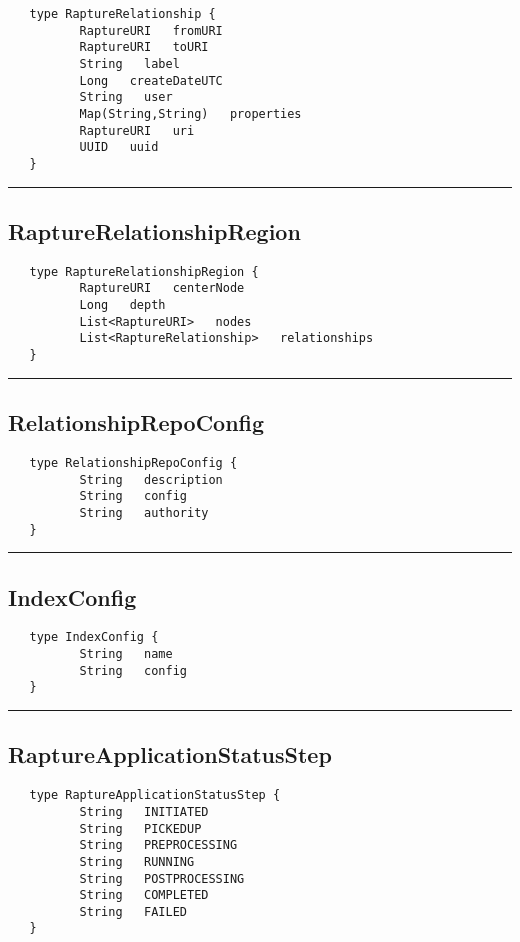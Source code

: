 \begin{verbatim}
   type RaptureRelationship {
          RaptureURI   fromURI
          RaptureURI   toURI
          String   label
          Long   createDateUTC
          String   user
          Map(String,String)   properties
          RaptureURI   uri
          UUID   uuid
   }
\end{verbatim}

\rule{15cm}{2pt}
\subsection{RaptureRelationshipRegion}
\label{type:RaptureRelationshipRegion}

\begin{verbatim}
   type RaptureRelationshipRegion {
          RaptureURI   centerNode
          Long   depth
          List<RaptureURI>   nodes
          List<RaptureRelationship>   relationships
   }
\end{verbatim}

\rule{15cm}{2pt}
\subsection{RelationshipRepoConfig}
\label{type:RelationshipRepoConfig}

\begin{verbatim}
   type RelationshipRepoConfig {
          String   description
          String   config
          String   authority
   }
\end{verbatim}

\rule{15cm}{2pt}
\subsection{IndexConfig}
\label{type:IndexConfig}

\begin{verbatim}
   type IndexConfig {
          String   name
          String   config
   }
\end{verbatim}

\rule{15cm}{2pt}
\subsection{RaptureApplicationStatusStep}
\label{type:RaptureApplicationStatusStep}

\begin{verbatim}
   type RaptureApplicationStatusStep {
          String   INITIATED
          String   PICKEDUP
          String   PREPROCESSING
          String   RUNNING
          String   POSTPROCESSING
          String   COMPLETED
          String   FAILED
   }
\end{verbatim}

